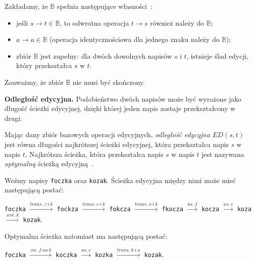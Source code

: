 \documentclass{praca1}
\begin{document}
\begin{property}\label{wl:001}
Zakładamy, że $\mathbb{B}$ spełnia następujące własności~\cite{Boytsov2011:indexingmethods}:
\begin{itemize}
\item jeśli $s \rightarrow t \in \mathbb{B}$, to odwrotna operacja $t \rightarrow s$ również należy do $\mathbb{B}$;
\item $a \rightarrow a \in \mathbb{B}$ (operacja identycznościowa dla jednego znaku należy do $\mathbb{B}$);
\item zbiór $\mathbb{B}$ jest zupełny: dla dwóch dowolnych napisów $s$ i $t$, istnieje ślad edycji, który przekształca $s$ w $t$.
\end{itemize}
\end{property}

Zauważmy, że zbiór $\mathbb{B}$ nie musi być skończony.

\textbf{Odległość edycyjna.} Podobieństwo dwóch napisów może być wyrażone jako długość ścieżki edycyjnej, dzięki której jeden napis zostaje przekształcony w drugi:

\begin{definition}
Mając dany zbiór bazowych operacji edycyjnych, \emph{odległość edycyjna} $ED(s,t)$ jest równa długości najkrótszej ścieżki edycyjnej, która przekształca napis $s$ w napis $t$. Najkrótsza ścieżka, która przekształca napis $s$ w napis $t$ jest nazywana \emph{optymalną} ścieżką edycyjną~\cite{Boytsov2011:indexingmethods}. 
\end{definition}

\begin{example}
Weźmy napisy \verb|foczka| oraz \verb|kozak|. Ścieżka edycyjna między nimi może mieć następującą postać:

\verb|foczka|  $\xrightarrow{trans.\ z\ i\ k}$ \verb|fockza| $\xrightarrow{trans.\ c\ i\ k}$ \verb|fokcza| $\xrightarrow{trans.\ o\ i\ k}$ \verb|fkocza| $\xrightarrow{us.\ f}$ \verb|kocza| $\xrightarrow{us.\ c}$ \verb|koza| $\xrightarrow{wst.\ k}$ \verb|kozak|.

Optymalna ścieżka natomiast ma następującą postać:

\verb|foczka| $\xrightarrow{zm.\ f\ na\ k}$ \verb|koczka|  $\xrightarrow{us.\ c}$ \verb|kozka| $\xrightarrow{trans.\ k\ i\ a}$ \verb|kozak|.

\end{example}
\end{document}
